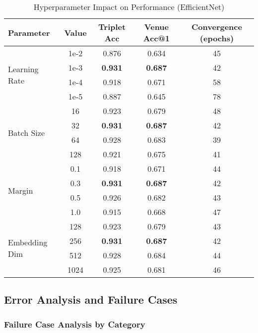 \begin{table}[H]
\centering
\caption{Hyperparameter Impact on Performance (EfficientNet)}
\begin{tabular}{|l|c|c|c|c|}
\hline
\textbf{Parameter} & \textbf{Value} & \textbf{Triplet Acc} & \textbf{Venue Acc@1} & \textbf{Convergence (epochs)} \\
\hline
\multirow{4}{*}{Learning Rate} & 1e-2 & 0.876 & 0.634 & 45 \\
& 1e-3 & \textbf{0.931} & \textbf{0.687} & 42 \\
& 1e-4 & 0.918 & 0.671 & 58 \\
& 1e-5 & 0.887 & 0.645 & 78 \\
\hline
\multirow{4}{*}{Batch Size} & 16 & 0.923 & 0.679 & 48 \\
& 32 & \textbf{0.931} & \textbf{0.687} & 42 \\
& 64 & 0.928 & 0.683 & 39 \\
& 128 & 0.921 & 0.675 & 41 \\
\hline
\multirow{4}{*}{Margin} & 0.1 & 0.918 & 0.671 & 44 \\
& 0.3 & \textbf{0.931} & \textbf{0.687} & 42 \\
& 0.5 & 0.926 & 0.682 & 43 \\
& 1.0 & 0.915 & 0.668 & 47 \\
\hline
\multirow{4}{*}{Embedding Dim} & 128 & 0.923 & 0.679 & 43 \\
& 256 & \textbf{0.931} & \textbf{0.687} & 42 \\
& 512 & 0.928 & 0.684 & 44 \\
& 1024 & 0.925 & 0.681 & 46 \\
\hline
\end{tabular}
\end{table}

\subsection{Error Analysis and Failure Cases}

\subsubsection{Failure Case Analysis by Category}


